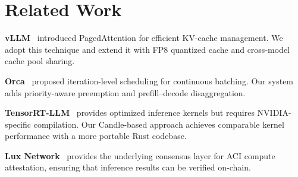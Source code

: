 \section{Related Work}

\label{sec:related}

\textbf{vLLM}~\cite{vllm2023} introduced PagedAttention for efficient KV-cache
management. We adopt this technique and extend it with FP8 quantized cache and
cross-model cache pool sharing.

\textbf{Orca}~\cite{orca2022} proposed iteration-level scheduling for
continuous batching. Our system adds priority-aware preemption and
prefill--decode disaggregation.

\textbf{TensorRT-LLM}~\cite{tensorrt} provides optimized inference kernels but
requires NVIDIA-specific compilation. Our Candle-based approach achieves
comparable kernel performance with a more portable Rust codebase.

\textbf{Lux Network}~\cite{luxwhitepaper} provides the underlying consensus
layer for ACI compute attestation, ensuring that inference results can be
verified on-chain.

